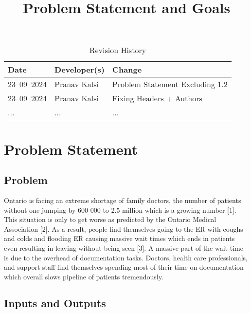 \documentclass{article}
\title{Problem Statement and Goals\\\progname}
\author{\authname}
\date{}
\begin{document}
\maketitle

\begin{table}[hp]
\caption{Revision History} \label{TblRevisionHistory}
\begin{tabularx}{\textwidth}{llX}
\toprule
\textbf{Date} & \textbf{Developer(s)} & \textbf{Change}\\
\midrule
23--09--2024 & Pranav Kalsi & Problem Statement Excluding 1.2\\
23--09--2024 & Pranav Kalsi & Fixing Headers + Authors\\
... & ... & ...\\
\bottomrule
\end{tabularx}
\end{table}

\section{Problem Statement}



\subsection{Problem}

Ontario is facing an extreme shortage of family doctors, the number of patients without one jumping by 600 000 to 2.5 million which is a growing number [1]. This situation is only to get worse as predicted by the Ontario Medical Association [2]. As a result, people find themselves going to the ER with coughs and colds and flooding ER causing massive wait times which ends in patients even resulting in leaving without being seen [3]. A massive part of the wait time is due to the overhead of documentation tasks. Doctors, health care professionals, and support staff find themselves spending most of their time on documentation which overall slows pipeline of patients tremendously.

\subsection{Inputs and Outputs}
\end{document}
